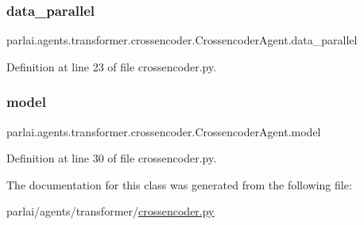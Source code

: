 \subsubsection{\texorpdfstring{data\+\_\+parallel}{data\_parallel}}
{\footnotesize\ttfamily parlai.\+agents.\+transformer.\+crossencoder.\+Crossencoder\+Agent.\+data\+\_\+parallel}



Definition at line 23 of file crossencoder.\+py.

\mbox{\label{classparlai_1_1agents_1_1transformer_1_1crossencoder_1_1CrossencoderAgent_a53447e9640405f06d1458eec65db5525}} 
\subsubsection{\texorpdfstring{model}{model}}
{\footnotesize\ttfamily parlai.\+agents.\+transformer.\+crossencoder.\+Crossencoder\+Agent.\+model}



Definition at line 30 of file crossencoder.\+py.



The documentation for this class was generated from the following file\+:\begin{DoxyCompactItemize}
\item 
parlai/agents/transformer/\hyperlink{crossencoder_8py}{crossencoder.\+py}\end{DoxyCompactItemize}
